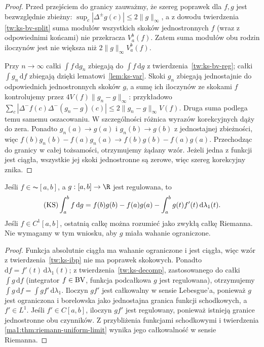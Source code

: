 \begin{proof}
Przed przejściem do granicy zauważmy, że szereg poprawek dla $f,g$ jest bezwzględnie zbieżny: $\sup_c|\Delta^\pm g(c)|\le2\|g\|_\infty$, a z dowodu twierdzenia \ref{tw:ks-bv-split} suma modułów wszystkich skoków jednostronnych $f$ (wraz z odpowiednimi końcami) nie przekracza $V_a^b(f)$. Zatem suma modułów obu rodzin iloczynów jest nie większa niż $2\|g\|_\infty V_a^b(f)$. 

Przy $n\to\infty$ całki $\int f\,\mathrm dg_n$ zbiegają do $\int f\,\mathrm dg$ z twierdzenia~\ref{tw:ks-bv-reg}; całki $\int g_n\,\mathrm df$ zbiegają dzięki lematowi~\ref{lem:ks-var}. Skoki $g_n$ zbiegają jednostajnie do odpowiednich jednostronnych skoków $g$, a sumę ich iloczynów ze skokami $f$ kontrolujemy przez $4V(f)\|g_n-g\|_\infty$: przykładowo $\sum_c|\Delta^-f(c)\Delta^-(g_n-g)(c)|\le2\|g_n-g\|_\infty V(f)$. Druga suma podlega temu samemu oszacowaniu. W szczególności różnica wyrazów korekcyjnych dąży
do zera. Ponadto $g_n(a)\to g(a)$ i $g_n(b)\to g(b)$
z jednostajnej zbieżności, więc
$f(b)g_n(b)-f(a)g_n(a)\to f(b)g(b)-f(a)g(a)$.
Przechodząc do granicy w całej tożsamości, otrzymujemy
żądany wzór. Jeżeli jedna z funkcji jest ciągła,
wszystkie jej skoki jednostronne są zerowe, więc
szereg korekcyjny znika.
\end{proof}

\begin{wniosek}
\label{wn:ks-ibp-ac}
Jeśli $f\in\AC[a,b]$, a $g:[a,b]\to\R$ jest regulowana, to
\[
 (\mathrm{KS})\int_a^b f\,\mathrm dg
 =f(b)g(b)-f(a)g(a)-\int_a^b g(t)f'(t)\,\mathrm d\lambda_1(t).
\]
Jeśli $f\in C^1[a,b]$, ostatnią całkę można rozumieć jako zwykłą całkę Riemanna. Nie wymagamy w tym wniosku, aby $g$ miała wahanie ograniczone.
\end{wniosek}
\begin{proof}
Funkcja absolutnie ciągła ma wahanie ograniczone i jest ciągła, więc wzór z twierdzenia~\ref{tw:ks-ibp} nie ma poprawek skokowych. Ponadto $\mathrm df=f'(t)\,\mathrm d\lambda_1(t)$; z twierdzenia~\ref{tw:ks-decomp}, zastosowanego do całki $\int g\,\mathrm df$ (integrator $f\in\mathrm{BV}$, funkcja podcałkowa $g$ jest regulowana), otrzymujemy $\int g\,\mathrm df=\int gf'\,\mathrm d\lambda_1$. Iloczyn $gf'$ jest całkowalny w sensie Lebesgue'a, ponieważ $g$ jest ograniczona i borelowska jako jednostajna granica funkcji schodkowych, a $f'\in L^1$. Jeśli $f'\in C[a,b]$, iloczyn $gf'$ jest regulowany, ponieważ istnieją granice jednostronne obu czynników. Z przybliżenia funkcjami schodkowymi i twierdzenia \ref{ma1:thm:riemann-uniform-limit} wynika jego całkowalność w sensie Riemanna.
\end{proof}

